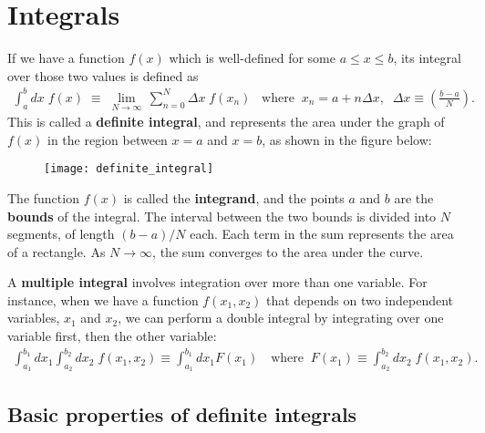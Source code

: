 \documentclass[10pt,a4paper]{article}
\begin{document}
\setcounter{page}{14}

\section{Integrals}
\label{integrals}

If we have a function $f(x)$ which is well-defined for some $a \le x
\le b $, its integral over those two values is defined as
\begin{align}
  \int_a^b dx\; f(x) \;\equiv\; \lim_{N \rightarrow \infty} \, \sum_{n=0}^{N} \Delta x\; f(x_n) \;\;\;\mathrm{where}\;\; x_n = a + n\Delta x, \;\; \Delta x \equiv \left(\frac{b-a}{N}\right).
\end{align}
This is called a \textbf{definite integral}, and represents the area
under the graph of $f(x)$ in the region between $x=a$ and $x=b$, as
shown in the figure below:

\begin{figure}[h]
  \centering\texttt{[image: definite\_integral]}
\end{figure}

\noindent
The function $f(x)$ is called the \textbf{integrand}, and the points
$a$ and $b$ are the \textbf{bounds} of the integral.  The interval
between the two bounds is divided into $N$ segments, of length
$(b-a)/N$ each. Each term in the sum represents the area of a
rectangle. As $N\rightarrow \infty$, the sum converges to the area
under the curve.

A \textbf{multiple integral} involves integration over more than one
variable.  For instance, when we have a function $f(x_1,x_2)$ that
depends on two independent variables, $x_1$ and $x_2$, we can perform
a double integral by integrating over one variable first, then the
other variable:
\begin{align}
  \int_{a_1}^{b_1} dx_1 \int_{a_2}^{b_2} dx_2 \; f(x_1, x_2) \equiv \int_{a_1}^{b_1} dx_1 F(x_1)\quad\text{where}\;\;F(x_1) \equiv \int_{a_2}^{b_2} dx_2 \; f(x_1, x_2).
\end{align}

\subsection{Basic properties of definite integrals}
\label{basic-properties-of-definite-integrals}
\end{document}
